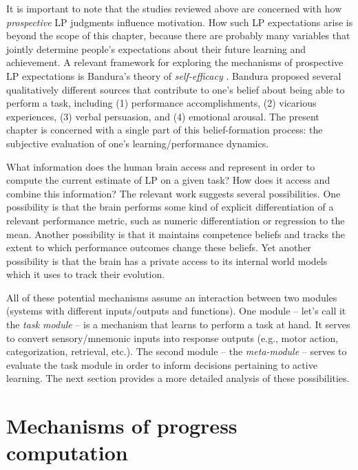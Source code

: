 It is important to note that the studies reviewed above are concerned with how \emph{prospective} \ac{LP} judgments influence motivation. How such \ac{LP} expectations arise is beyond the scope of this chapter, because there are probably many variables that jointly determine people's expectations about their future learning and achievement. A relevant framework for exploring the mechanisms of prospective \ac{LP} expectations is Bandura's theory of \emph{self-efficacy} \cite{bandura_self-efficacy_1977}. Bandura proposed several qualitatively different sources that contribute to one's belief about being able to perform a task, including (1) performance accomplishments, (2) vicarious experiences, (3) verbal persuasion, and (4) emotional arousal. The present chapter is concerned with a single part of this belief-formation process: the subjective evaluation of one's learning/performance dynamics. 

What information does the human brain access and represent in order to compute the current estimate of \ac{LP} on a given task? How does it access and combine this information? The relevant work suggests several possibilities. One possibility is that the brain performs some kind of explicit differentiation of a relevant performance metric, such as numeric differentiation or regression to the mean. Another possibility is that it maintains competence beliefs and tracks the extent to which performance outcomes change these beliefs. Yet another possibility is that the brain has a private access to its internal world models which it uses to track their evolution.

All of these potential mechanisms assume an interaction between two modules (systems with different inputs/outputs and functions). One module -- let's call it the \emph{task module} -- is a mechanism that learns to perform a task at hand. It serves to convert sensory/mnemonic inputs into response outputs (e.g., motor action, categorization, retrieval, etc.). The second module -- the \emph{meta-module} -- serves to evaluate the task module in order to inform decisions pertaining to active learning. The next section provides a more detailed analysis of these possibilities. 

\section{Mechanisms of progress computation}

